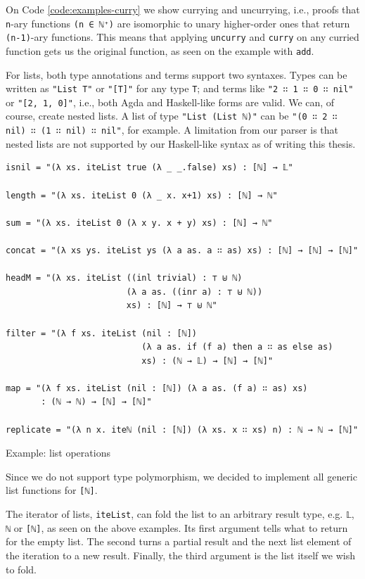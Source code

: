 On Code \ref{code:examples-curry} we show currying and uncurrying, i.e., proofs that \verb$n$-ary functions \verb$(n ∈ ℕ⁺)$ are isomorphic to unary higher-order ones that return \verb$(n-1)$-ary functions. This means that applying \verb$uncurry$ and \verb$curry$ on any curried function gets us the original function, as seen on the example with \verb$add$.

For lists, both type annotations and terms support two syntaxes. Types can be written as \verb$"List T"$ or \verb$"[T]"$ for any type \verb$T$; and terms like \verb$"2 ∷ 1 ∷ 0 ∷ nil"$ or \verb$"[2, 1, 0]"$, i.e., both Agda and Haskell-like forms are valid. We can, of course, create nested lists. A list of type \verb$"List (List ℕ)"$ can be \verb$"(0 ∷ 2 ∷ nil) ∷ (1 ∷ nil) ∷ nil"$, for example. A limitation from our parser is that nested lists are not supported by our Haskell-like syntax as of writing this thesis.

\begin{listing}[H]
\begin{verbatim}
isnil = "(λ xs. iteList true (λ _ _.false) xs) : [ℕ] → 𝕃"

length = "(λ xs. iteList 0 (λ _ x. x+1) xs) : [ℕ] → ℕ"

sum = "(λ xs. iteList 0 (λ x y. x + y) xs) : [ℕ] → ℕ"

concat = "(λ xs ys. iteList ys (λ a as. a ∷ as) xs) : [ℕ] → [ℕ] → [ℕ]"

headM = "(λ xs. iteList ((inl trivial) : ⊤ ⊎ ℕ)
                        (λ a as. ((inr a) : ⊤ ⊎ ℕ))
                        xs) : [ℕ] → ⊤ ⊎ ℕ"

filter = "(λ f xs. iteList (nil : [ℕ])
                           (λ a as. if (f a) then a ∷ as else as)
                           xs) : (ℕ → 𝕃) → [ℕ] → [ℕ]"

map = "(λ f xs. iteList (nil : [ℕ]) (λ a as. (f a) ∷ as) xs)
       : (ℕ → ℕ) → [ℕ] → [ℕ]"

replicate = "(λ n x. iteℕ (nil : [ℕ]) (λ xs. x ∷ xs) n) : ℕ → ℕ → [ℕ]"
\end{verbatim}
\caption{Example: list operations}
\label{code:examples-lists}
\end{listing}

Since we do not support type polymorphism, we decided to implement all generic list functions for \verb$[ℕ]$.

The iterator of lists, \verb$iteList$, can fold the list to an arbitrary result type, e.g. \verb$𝕃$, \verb$ℕ$ or \verb$[ℕ]$, as seen on the above examples. Its first argument tells what to return for the empty list. The second turns a partial result and the next list element of the iteration to a new result. Finally, the third argument is the list itself we wish to fold.

